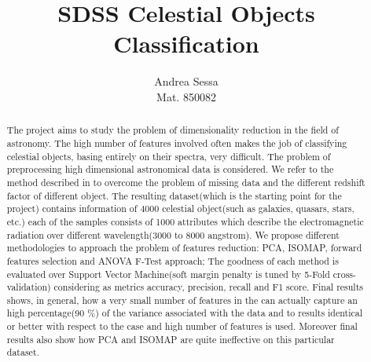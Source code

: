 \documentclass[a4paper,10pt]{article}
\title{SDSS Celestial Objects Classification}
\author{Andrea Sessa \\ \vspace{1cm} \small{Mat. 850082}}
\date{}
\begin{document}
\maketitle

\begin{abstract}
  The project aims to study the problem of dimensionality reduction in the field of astronomy.
  The high number of features involved often makes the job of classifying celestial objects, 
  basing entirely on their spectra, very difficult. The problem of preprocessing high dimensional 
  astronomical data is considered. We refer to the method described in \cite{redshift} to 
  overcome the problem of missing data and the different redshift factor of different object.
  The resulting dataset(which is the starting point for the project) contains information of
  4000 celestial object(such as galaxies, quasars, stars, etc.) each of the samples consists
  of 1000 attributes which describe the electromagnetic radiation over different wavelength(3000 to 8000 angstrom).
  We propose different methodologies to approach the problem of features reduction:
  PCA, ISOMAP, forward features selection and ANOVA F-Test approach;
  The goodness of each method is evaluated over Support Vector Machine(soft margin penalty is tuned by 5-Fold cross-validation)
  considering as metrics accuracy, precision, recall and F1 score.
  Final results shows, in general, how a very small number of features in the can actually capture an high percentage(90 \%)
  of the variance associated with the data and to results identical or better with respect to the case and high number
  of features is used. Moreover final results also show how PCA and ISOMAP are quite ineffective on this particular dataset.
\end{abstract}

\newpage

\tableofcontents

\newpage

\listoffigures

\newpage
\end{document}
